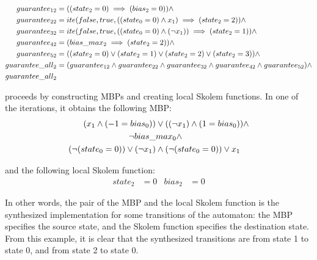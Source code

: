 \begin{equation}
\begin{aligned}
  guarantee_{12}&=((state_2=0)\implies (bias_2=0)) \land\\
  guarantee_{22}&=ite(false, true, ((state_0=0)\land x_1)\implies (state_2=2)) \land\\
  guarantee_{32}&=ite(false, true, ((state_0=0)\land (\neg x_1))\implies (state_2=1)) \land\\
  guarantee_{42}&=(bias\_max_2\implies (state_2=2)) \land\\
  guarantee_{52}&=((state_2=0) \lor (state_2=1) \lor (state_2=2) \lor (state_2=3))\land \\
  guarantee\_all_2&=(guarantee_{12}\land guarantee_{22}\land guarantee_{32}\land guarantee_{42} \land guarantee_{52})\land \\
  guarantee\_all_2&\notag
\end{aligned}
\end{equation}

\aeval proceeds by constructing MBPs and creating local Skolem functions. 
In one of the iterations, it obtains the following MBP:%
\begin{equation}
\begin{aligned}
  (x_1\land (-1=bias_0)) &\lor ((\neg x_1)\land (1=bias_0)) \land \\
  \neg bias\_&max_0 \land \\
  (\neg (state_0=0))\lor (\neg x_1) &\land
  (\neg (state_0=0))\lor x_1  \notag
\end{aligned}
\end{equation}

and the following local Skolem function:%
\begin{align*}
  state_2&=0 &
  bias_2&=0
\end{align*}

In other words, the pair of the MBP and the local Skolem function is the synthesized implementation for some transitions of the automaton: the MBP specifies the source state, and the Skolem function specifies the destination state.
From this example, it is clear that the synthesized transitions are from state 1 to state 0, and from state 2 to state 0.